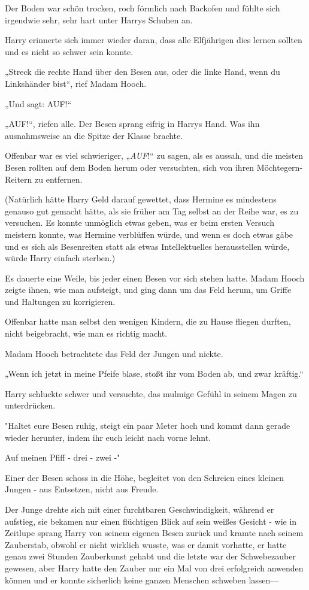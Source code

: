 {Der Boden war schön trocken, roch förmlich nach Backofen und fühlte sich irgendwie sehr, sehr hart unter Harrys Schuhen an.

Harry erinnerte sich immer wieder daran, dass alle Elfjährigen dies lernen sollten und es nicht so schwer sein konnte.

„Streck die rechte Hand über den Besen aus, oder die linke Hand, wenn du Linkshänder bist“, rief Madam Hooch.

„Und sagt: AUF!“

„AUF!“, riefen alle. Der Besen sprang eifrig in Harrys Hand. Was ihn ausnahmsweise an die Spitze der Klasse brachte.

Offenbar war es viel schwieriger, „\emph{AUF}!“ zu sagen, als es aussah, und die meisten Besen rollten auf dem Boden herum oder versuchten, sich von ihren Möchtegern-Reitern zu entfernen.

(Natürlich hätte Harry Geld darauf gewettet, dass Hermine es mindestens genauso gut gemacht hätte, als sie früher am Tag selbst an der Reihe war, es zu versuchen. Es konnte unmöglich etwas geben, was er beim ersten Versuch meistern konnte, was Hermine verblüffen würde, und wenn es doch etwas gäbe und es sich als Besenreiten statt als etwas Intellektuelles herausstellen würde, würde Harry einfach sterben.)

Es dauerte eine Weile, bis jeder einen Besen vor sich stehen hatte. Madam Hooch zeigte ihnen, wie man aufsteigt, und ging dann um das Feld herum, um Griffe und Haltungen zu korrigieren.

Offenbar hatte man selbst den wenigen Kindern, die zu Hause fliegen durften, nicht beigebracht, wie man es richtig macht.

Madam Hooch betrachtete das Feld der Jungen und nickte.

„Wenn ich jetzt in meine Pfeife blase, stoßt ihr vom Boden ab, und zwar kräftig.“

Harry schluckte schwer und versuchte, das mulmige Gefühl in seinem Magen zu unterdrücken.

"Haltet eure Besen ruhig, steigt ein paar Meter hoch und kommt dann gerade wieder herunter, indem ihr euch leicht nach vorne lehnt.

Auf meinen Pfiff - drei - zwei -"

Einer der Besen schoss in die Höhe, begleitet von den Schreien eines kleinen Jungen - aus Entsetzen, nicht aus Freude.

Der Junge drehte sich mit einer furchtbaren Geschwindigkeit, während er aufstieg, sie bekamen nur einen flüchtigen Blick auf sein weißes Gesicht - wie in Zeitlupe sprang Harry von seinem eigenen Besen zurück und kramte nach seinem Zauberstab, obwohl er nicht wirklich wusste, was er damit vorhatte, er hatte genau zwei Stunden Zauberkunst gehabt und die letzte war der Schwebezauber gewesen, aber Harry hatte den Zauber nur ein Mal von drei erfolgreich anwenden können und er konnte sicherlich keine ganzen Menschen schweben lassen—

}
